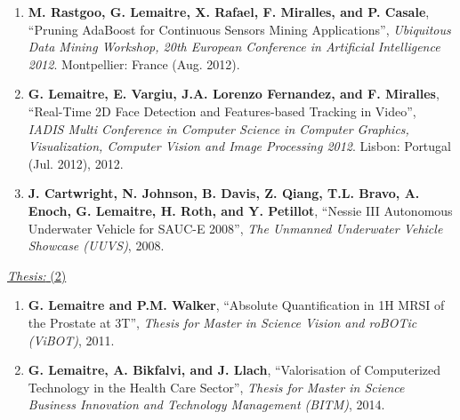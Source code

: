 {\begin{enumerate}
\item \textbf{M. Rastgoo, G. Lemaitre, X. Rafael, F. Miralles, and P. Casale}, ``Pruning AdaBoost for Continuous Sensors Mining Applications'', \textit{Ubiquitous Data Mining Workshop, 20th European Conference in Artificial Intelligence 2012}. Montpellier: France (Aug. 2012).
\item \textbf{G. Lemaitre, E. Vargiu, J.A. Lorenzo Fernandez, and F. Miralles}, ``Real-Time 2D Face Detection and Features-based Tracking in Video'', \textit{IADIS Multi Conference in Computer Science in Computer Graphics, Visualization, Computer Vision and Image Processing 2012}. Lisbon: Portugal (Jul. 2012), 2012.
\item \textbf{J. Cartwright, N. Johnson, B. Davis, Z. Qiang, T.L. Bravo, A. Enoch, G. Lemaitre, H. Roth, and Y. Petillot}, ``Nessie III Autonomous Underwater Vehicle for SAUC-E 2008'', \textit{The Unmanned Underwater Vehicle Showcase (UUVS)}, 2008.
\end{enumerate}

\underline{\textit{Thesis:} (2)}

\begin{enumerate}
\item \textbf{G. Lemaitre and P.M. Walker}, ``Absolute Quantification in 1H MRSI of the Prostate at 3T'', \textit{Thesis for Master in Science Vision and roBOTic (ViBOT)}, 2011.
\item \textbf{G. Lemaitre, A. Bikfalvi, and J. Llach}, ``Valorisation of Computerized Technology in the Health Care Sector'', \textit{Thesis for Master in Science Business Innovation and Technology Management (BITM)}, 2014.
\end{enumerate}

}